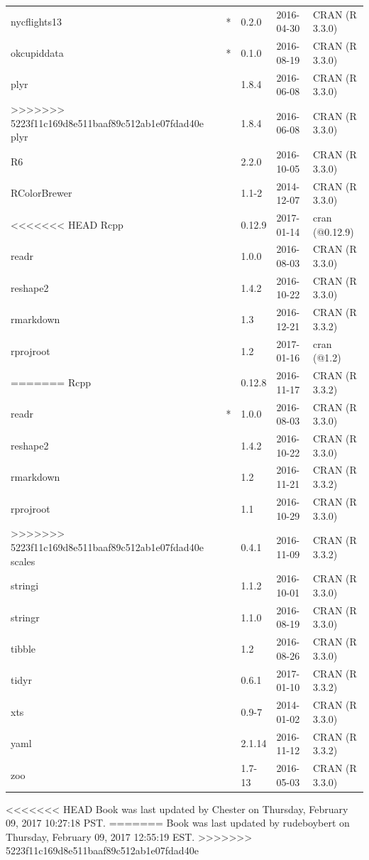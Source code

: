 \documentclass[]{tufte-book}
\begin{document}
\begin{longtable}{lllll}
nycflights13 & * & 0.2.0 & 2016-04-30 & CRAN (R 3.3.0)\\
okcupiddata & * & 0.1.0 & 2016-08-19 & CRAN (R 3.3.0)\\
plyr &  & 1.8.4 & 2016-06-08 & CRAN (R 3.3.0)\\
>>>>>>> 5223f11c169d8e511baaf89c512ab1e07fdad40e
\addlinespace
plyr &  & 1.8.4 & 2016-06-08 & CRAN (R 3.3.0)\\
R6 &  & 2.2.0 & 2016-10-05 & CRAN (R 3.3.0)\\
RColorBrewer &  & 1.1-2 & 2014-12-07 & CRAN (R 3.3.0)\\
<<<<<<< HEAD
Rcpp &  & 0.12.9 & 2017-01-14 & cran (@0.12.9)\\
readr &  & 1.0.0 & 2016-08-03 & CRAN (R 3.3.0)\\
\addlinespace
reshape2 &  & 1.4.2 & 2016-10-22 & CRAN (R 3.3.0)\\
rmarkdown &  & 1.3 & 2016-12-21 & CRAN (R 3.3.2)\\
rprojroot &  & 1.2 & 2017-01-16 & cran (@1.2)\\
=======
Rcpp &  & 0.12.8 & 2016-11-17 & CRAN (R 3.3.2)\\
readr & * & 1.0.0 & 2016-08-03 & CRAN (R 3.3.0)\\
reshape2 &  & 1.4.2 & 2016-10-22 & CRAN (R 3.3.0)\\
\addlinespace
rmarkdown &  & 1.2 & 2016-11-21 & CRAN (R 3.3.2)\\
rprojroot &  & 1.1 & 2016-10-29 & CRAN (R 3.3.0)\\
>>>>>>> 5223f11c169d8e511baaf89c512ab1e07fdad40e
scales &  & 0.4.1 & 2016-11-09 & CRAN (R 3.3.2)\\
stringi &  & 1.1.2 & 2016-10-01 & CRAN (R 3.3.0)\\
\addlinespace
stringr &  & 1.1.0 & 2016-08-19 & CRAN (R 3.3.0)\\
tibble &  & 1.2 & 2016-08-26 & CRAN (R 3.3.0)\\
tidyr &  & 0.6.1 & 2017-01-10 & CRAN (R 3.3.2)\\
xts &  & 0.9-7 & 2014-01-02 & CRAN (R 3.3.0)\\
yaml &  & 2.1.14 & 2016-11-12 & CRAN (R 3.3.2)\\
zoo &  & 1.7-13 & 2016-05-03 & CRAN (R 3.3.0)\\
\bottomrule
\end{longtable}

<<<<<<< HEAD
Book was last updated by Chester on Thursday, February 09, 2017 10:27:18
PST.
=======
Book was last updated by rudeboybert on Thursday, February 09, 2017
12:55:19 EST.
>>>>>>> 5223f11c169d8e511baaf89c512ab1e07fdad40e
\end{document}
